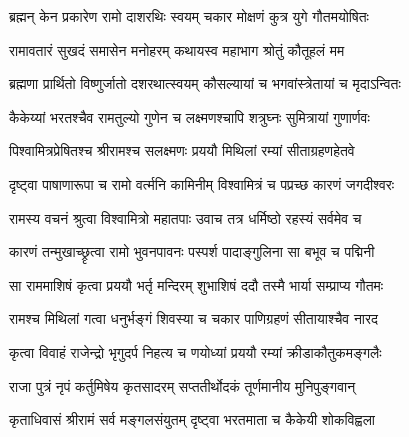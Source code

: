 


\storymeta



\twolineshloka
{ब्रह्मन् केन प्रकारेण रामो दाशरथिः स्वयम्}
{चकार मोक्षणं कुत्र युगे गौतमयोषितः}%


\twolineshloka
{रामावतारं सुखदं समासेन मनोहरम्}
{कथायस्व महाभाग श्रोतुं कौतूहलं मम}%


\twolineshloka
{ब्रह्मणा प्रार्थितो विष्णुर्जातो दशरथात्स्वयम्}
{कौसल्यायां च भगवांस्त्रेतायां च मृदाऽन्वितः}%


\twolineshloka
{कैकेय्यां भरतश्चैव रामतुल्यो गुणेन च}
{लक्ष्मणश्चापि शत्रुघ्नः सुमित्रायां गुणार्णवः}%


\twolineshloka
{पिश्वामित्रप्रेषितश्च श्रीरामश्च सलक्ष्मणः}
{प्रययौ मिथिलां रम्यां सीताग्रहणहेतवे}%


\twolineshloka
{दृष्ट्वा पाषाणारूपा च रामो वर्त्मनि कामिनीम्}
{विश्वामित्रं च पप्रच्छ कारणं जगदीश्वरः}%


\twolineshloka
{रामस्य वचनं श्रुत्वा विश्वामित्रो महातपाः}
{उवाच तत्र धर्मिष्ठो रहस्यं सर्वमेव च}%


\twolineshloka
{कारणं तन्मुखाच्छ्रृत्वा रामो भुवनपावनः}
{पस्पर्श पादाङ्गुलिना सा बभूव च पद्मिनी}%


\twolineshloka
{सा राममाशिषं कृत्वा प्रययौ भर्तृ मन्दिरम्}
{शुभाशिषं ददौ तस्मै भार्या सम्प्राप्य गौतमः}%


\twolineshloka
{रामश्च मिथिलां गत्वा धनुर्भङ्गं शिवस्या च}
{चकार पाणिग्रहणं सीतायाश्चैव नारद}%


\twolineshloka
{कृत्वा विवाहं राजेन्द्रो भृगुदर्प निहत्य च}
{णयोध्यां प्रययौ रम्यां क्रीडाकौतुकमङ्गलैः}%


\twolineshloka
{राजा पुत्रं नृपं कर्तुमिषेय कृतसादरम्}
{सप्ततीर्थोदकं तूर्णमानीय मुनिपुङ्गवान्}%


\twolineshloka
{कृताधिवासं श्रीरामं सर्व मङ्गलसंयुतम्}
{दृष्ट्वा भरतमाता च कैकेयी शोकविह्वला}%


